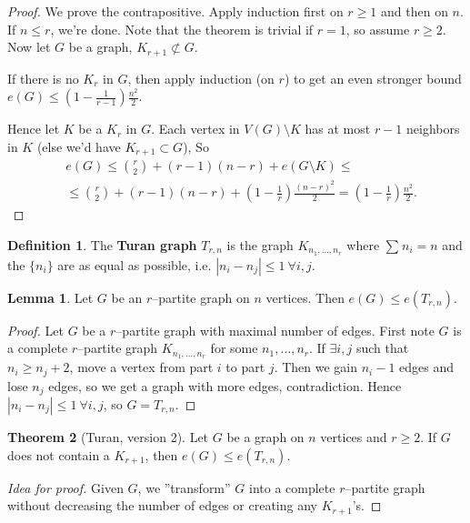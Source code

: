 \documentclass{article}
\theoremstyle{definition}
\newtheorem{theorem}{Theorem}[section]
\newtheorem{lemma}[theorem]{Lemma}
\newtheorem{defn}{Definition}[section]
\begin{document}
\begin{proof}
    We prove the contrapositive. Apply induction first on $r\ge 1$ and then on $n$. If $n\le r$, we're done. Note that the theorem is trivial if $r=1$, so assume $r\ge 2$. Now let $G$ be a graph, $K_{r+1} \not\subset G$.

    If there is no $K_r$ in $G$, then apply induction (on $r$) to get an even stronger bound $e(G) \le (1-\frac{1}{r-1})\frac{n^2}{2}$.
    \vspace{1mm}
    
    Hence let $K$ be a $K_r$ in $G$. Each vertex in $V(G)\setminus K$ has at most $r-1$ neighbors in $K$ (else we'd have $K_{r+1} \subset G$), So
    \begin{align*}
        &e(G) \le {{r}\choose{2}} + (r-1)(n-r) + e(G\setminus K) \le \\
        &\le {{r}\choose{2}} + (r-1)(n-r) + \left(1-\frac{1}{r}\right)\frac{(n-r)^2}{2} = \left(1-\frac{1}{r}\right)\frac{n^2}{2}.
    \end{align*}
\end{proof}
\begin{defn}
    The \textbf{Turan graph} $T_{r,n}$ is the graph $K_{n_1,\ldots,n_r}$ where $\sum_{}^{} n_i=n$ and the $\{n_i\}$ are as equal as possible, i.e. $|n_i-n_j|\le 1 ~\forall i,j$.
\end{defn}
\begin{lemma}\label{4.6}
    Let $G$ be an $r$--partite graph on $n$ vertices. Then $e(G) \le e(T_{r,n})$.
\end{lemma}
\begin{proof}
    Let $G$ be a $r$--partite graph with maximal number of edges. First note $G$ is a complete $r$--partite graph $K_{n_1,\ldots,n_r}$ for some $n_1,\ldots,n_r$. If $\exists i,j$ such that $n_i \ge n_j +2$, move a vertex from part $i$ to part $j$. Then we gain $n_i-1$ edges and lose $n_j$ edges, so we get a graph with more edges, contradiction. Hence $|n_i-n_j|\le 1 ~\forall i,j$, so $G=T_{r,n}$.
\end{proof}
\begin{theorem}[Turan, version 2]
    Let $G$ be a graph on $n$ vertices and $r\ge 2$. If $G$ does not contain a $K_{r+1}$, then $e(G) \le e(T_{r,n})$.
\end{theorem}
\begin{proof}[Idea for proof]
    Given $G$, we ''transform'' $G$ into a complete $r$--partite graph without decreasing the number of edges or creating any $K_{r+1}$'s.
\end{proof}
\end{document}
